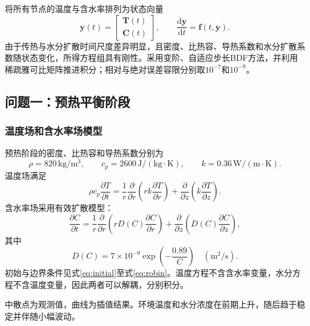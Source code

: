 将所有节点的温度与含水率排列为状态向量
\begin{equation}\label{eq:ode}
\boldsymbol y(t)=
\begin{bmatrix}\boldsymbol T(t)\\\boldsymbol C(t)\end{bmatrix},
\qquad
\frac{\mathrm d\boldsymbol y}{\mathrm dt}
=\boldsymbol f(t,\boldsymbol y).
\end{equation}
由于传热与水分扩散时间尺度差异明显，且密度、比热容、导热系数和水分扩散系数随状态变化，所得方程组具有刚性。采用变阶、自适应步长BDF方法，并利用稀疏雅可比矩阵推进积分；相对与绝对误差容限分别取$10^{-7}$和$10^{-9}$。

\FloatBarrier
\subsection{问题一：预热平衡阶段}
\subsubsection{温度场和含水率场模型}
预热阶段的密度、比热容和导热系数分别为
\begin{equation}
\rho=820\,\mathrm{kg/m^3},\qquad
c_p=2600\,\mathrm{J/(kg\cdot K)},\qquad
k=0.36\,\mathrm{W/(m\cdot K)}.
\end{equation}
温度场满足
\begin{equation}\label{eq:q1-temperature}
\rho c_p\frac{\partial T}{\partial t}
=\frac1r\frac{\partial}{\partial r}
\left(rk\frac{\partial T}{\partial r}\right)
+\frac{\partial}{\partial z}\left(k\frac{\partial T}{\partial z}\right).
\end{equation}
含水率场采用有效扩散模型：
\begin{equation}\label{eq:q1-moisture}
\frac{\partial C}{\partial t}
=\frac1r\frac{\partial}{\partial r}
\left(rD(C)\frac{\partial C}{\partial r}\right)
+\frac{\partial}{\partial z}\left(D(C)\frac{\partial C}{\partial z}\right),
\end{equation}
其中
\begin{equation}\label{eq:q1-D}
D(C)=7\times10^{-9}\exp\left(-\frac{0.89}{C}\right)\quad(\mathrm{m^2/s}).
\end{equation}
初始与边界条件见式\eqref{eq:initial}至式\eqref{eq:robin}。温度方程不含含水率变量，水分方程不含温度变量，因此两者可以解耦，分别积分。

中散点为观测值，曲线为插值结果。环境温度和水分浓度在前期上升，随后趋于稳定并伴随小幅波动。

